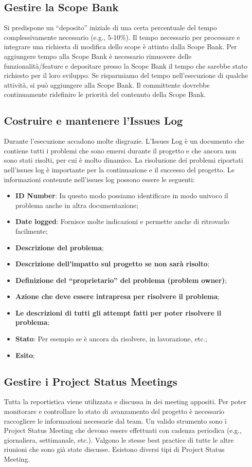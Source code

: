\subsection{Gestire la Scope Bank}
Si predispone un “deposito” iniziale di una certa percentuale del tempo complessivamente necessario (e.g., 5-10\%).
Il tempo necessario per processare e integrare una richiesta di modifica dello scope è attinto dalla Scope Bank.
Per aggiungere tempo alla Scope Bank è necessario rimuovere delle funzionalità/feature e depositare presso la Scope Bank il tempo che sarebbe stato richiesto per il loro sviluppo.
Se risparmiamo del tempo nell’esecuzione di qualche attività, si può aggiungere alla Scope Bank.
Il committente dovrebbe continuamente ridefinire le priorità del contenuto della Scope Bank.
\subsection{Costruire e mantenere l’Issues Log}
Durante l'esecuzione accadono molte disgrazie. L’Issues Log è un documento che contiene tutti i problemi che sono emersi durante il progetto e che ancora non sono stati risolti, per cui è molto dinamico.
La risoluzione dei problemi riportati nell’issues log è importante per la continuazione e il successo del progetto.
Le informazioni contenute nell’issues log possono essere le seguenti:
\begin{itemize}
	\item \textbf{ID Number}: In questo modo possiamo identificare in modo univoco il problema anche in altra documentazione;
	\item \textbf{Date logged}: Fornisce molte indicazioni e permette anche di ritrovarlo facilmente;
	\item \textbf{Descrizione del problema};
	\item \textbf{Descrizione dell’impatto sul progetto se non sarà risolto};
	\item \textbf{Definizione del “proprietario” del problema (problem owner)};
	\item \textbf{Azione che deve essere intrapresa per risolvere il problema};
	\item \textbf{Le descrizioni di tutti gli attempt fatti per poter risolvere il problema};
	\item \textbf{Stato}: Per esempio se è ancora da risolvere, in lavorazione, etc.;
	\item \textbf{Esito};
\end{itemize}

\subsection{Gestire i Project Status Meetings}
Tutta la reportistica viene utilizzata e discussa in dei meeting appositi.
Per poter monitorare e controllare lo stato di avanzamento del progetto è necessario raccogliere le informazioni necessarie dal team.
Un valido strumento sono i Project Status Meeting che devono essere effettuati con cadenza periodica (e.g., giornaliera, settimanale, etc.). Valgono le stesse best practice di tutte le altre riunioni che sono già state discusse. Esistono diversi tipi di Project Status Meeting.


